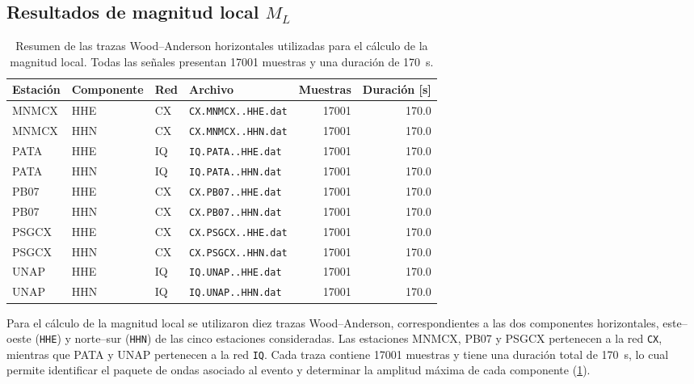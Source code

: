 \documentclass[a4paper,12pt]{article} %
\numberwithin{equation}{section} %
\numberwithin{figure}{section} %
\begin{document}
\subsection{Resultados de magnitud local \(M_L\)}

\begin{table}[htb]
    \centering
    \caption{Resumen de las trazas Wood--Anderson horizontales utilizadas para el cálculo de la magnitud local. Todas las señales presentan 17001 muestras y una duración de 170~s.}
    \label{tab:trazas-wa}
    \begin{tabular}{l l l l r r}
        \hline
        Estación & Componente & Red & Archivo & Muestras & Duración [s] \\
        \hline
        MNMCX & HHE & CX & \texttt{CX.MNMCX..HHE.dat} & 17001 & 170.0 \\
        MNMCX & HHN & CX & \texttt{CX.MNMCX..HHN.dat} & 17001 & 170.0 \\
        PATA  & HHE & IQ & \texttt{IQ.PATA..HHE.dat}  & 17001 & 170.0 \\
        PATA  & HHN & IQ & \texttt{IQ.PATA..HHN.dat}  & 17001 & 170.0 \\
        PB07  & HHE & CX & \texttt{CX.PB07..HHE.dat} & 17001 & 170.0 \\
        PB07  & HHN & CX & \texttt{CX.PB07..HHN.dat} & 17001 & 170.0 \\
        PSGCX & HHE & CX & \texttt{CX.PSGCX..HHE.dat} & 17001 & 170.0 \\
        PSGCX & HHN & CX & \texttt{CX.PSGCX..HHN.dat} & 17001 & 170.0 \\
        UNAP  & HHE & IQ & \texttt{IQ.UNAP..HHE.dat} & 17001 & 170.0 \\
        UNAP  & HHN & IQ & \texttt{IQ.UNAP..HHN.dat} & 17001 & 170.0 \\
        \hline
    \end{tabular}
\end{table}

Para el cálculo de la magnitud local se utilizaron diez trazas Wood--Anderson, correspondientes a las dos componentes horizontales, este--oeste (\texttt{HHE}) y norte--sur (\texttt{HHN}) de las cinco estaciones consideradas. Las estaciones MNMCX, PB07 y PSGCX pertenecen a la red \texttt{CX}, mientras que PATA y UNAP pertenecen a la red \texttt{IQ}. Cada traza contiene 17001 muestras y tiene una duración total de 170~s, lo cual permite identificar el paquete de ondas asociado al evento y determinar la amplitud máxima de cada componente (\ref{tab:trazas-wa}).
\end{document}
